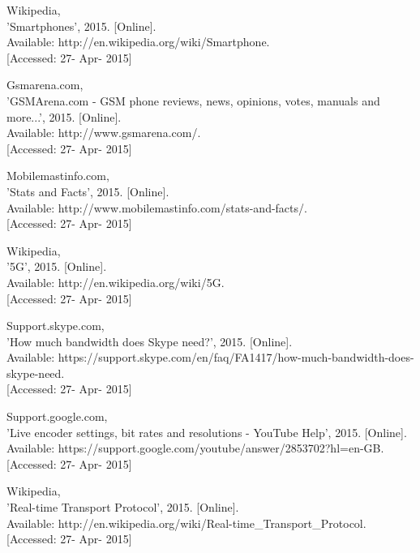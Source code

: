 \documentclass[]{article}
\begin{document}
\begin{enumerate}[label={[\arabic*]}]
\item  Wikipedia, \\{}'Smartphones', 2015. [Online].\\{} Available: http://en.wikipedia.org/wiki/Smartphone.\\{} [Accessed: 27- Apr- 2015]

\item  Gsmarena.com, \\{}'GSMArena.com - GSM phone reviews, news, opinions, votes, manuals and more...', 2015. [Online].\\{} Available: http://www.gsmarena.com/. \\{}[Accessed: 27- Apr- 2015]

\item  Mobilemastinfo.com, \\{}'Stats and Facts', 2015. [Online].\\{} Available: http://www.mobilemastinfo.com/stats-and-facts/. \\{}[Accessed: 27- Apr- 2015]

\item  Wikipedia, \\{}'5G', 2015. [Online].\\{} Available: http://en.wikipedia.org/wiki/5G.\\{} [Accessed: 27- Apr- 2015]

\item  Support.skype.com, \\{}'How much bandwidth does Skype need?', 2015. [Online]. \\{}Available: https://support.skype.com/en/faq/FA1417/how-much-bandwidth-does-skype-need. \\{}[Accessed: 27- Apr- 2015]

\item  Support.google.com, \\{}'Live encoder settings, bit rates and resolutions - YouTube Help', 2015. [Online].\\{} Available: https://support.google.com/youtube/answer/2853702?hl=en-GB.\\{} [Accessed: 27- Apr- 2015]

\item  Wikipedia,\\{} 'Real-time Transport Protocol', 2015. [Online]. \\{}Available: http://en.wikipedia.org/wiki/Real-time\_Transport\_Protocol. \\{}[Accessed: 27- Apr- 2015]


\end{enumerate}
\end{document}
